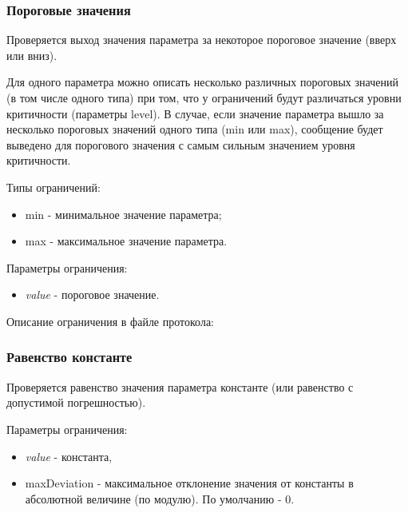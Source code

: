 

\subsubsection{Пороговые значения}

Проверяется выход значения параметра за некоторое пороговое значение (вверх или 
вниз).

Для одного параметра можно описать несколько различных пороговых значений (в 
том числе одного типа) при том, что у ограничений будут различаться уровни 
критичности (параметры level). В случае, если значение параметра вышло за 
несколько пороговых значений одного типа (min или max), сообщение будет 
выведено для порогового значения с самым сильным значением уровня критичности.

Типы ограничений:

\begin{itemize}
 \item min - минимальное значение параметра;
 \item max - максимальное значение параметра.
\end{itemize}

Параметры ограничения:

\begin{itemize}
 \item \textit{value} - пороговое значение.
\end{itemize}

Описание ограничения в файле протокола:




\subsubsection{Равенство константе}

Проверяется равенство значения параметра константе (или равенство 
с допустимой погрешностью).

Параметры ограничения:
\begin{itemize}
 \item \textit{value} - константа,
 \item maxDeviation - максимальное отклонение значения от константы в 
абсолютной величине (по модулю). По умолчанию - 0.
\end{itemize}

